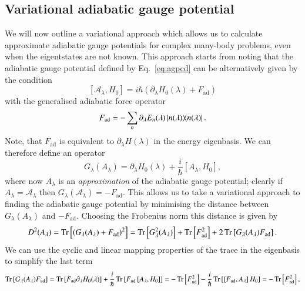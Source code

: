 \subsection{Variational adiabatic gauge potential}
\label{sec:varcd}
We will now outline a variational approach which allows us to calculate approximate adiabatic gauge potentials for complex many-body problems, even when the eigentstates are not known. This approach starts from noting that the adiabatic gauge potential defined by Eq.~\eqref{eq:agpcd} can be alternatively given by the condition \cite{jarzynski2013generating,sels2017minimizing,kolodrubetz2017geometry}
\begin{equation}
    \left[ \mathcal{A}_\lambda, H_0 \right] = i \hbar \left( \partial_\lambda H_0(\lambda) + F_\text{ad} \right)
\end{equation}
with the generalised adiabatic force operator
\begin{equation}
    F_\text{ad} = - \sum_n \partial_\lambda E_n (\lambda) \ketbra{n(\lambda)}.
\end{equation}
Note, that $F_\text{ad}$ is equivalent to $\partial_\lambda H(\lambda)$ in the energy eigenbasis. We can therefore define an operator
\begin{equation}\label{eq:glambda}
    G_\lambda (A_\lambda) = \partial_\lambda H_0(\lambda) + \frac{i}{\hbar} \left[ A_\lambda, H_0 \right],
\end{equation}
where now $A_\lambda$ is an {\it approximation} of the adiabatic gauge potential; clearly if $A_\lambda = \mathcal{A}_\lambda$ then $G_\lambda (\mathcal{A}_\lambda) = -F_\text{ad}$. This allows us to take a variational approach to finding the adiabatic gauge potential by minimising the distance between $G_\lambda(A_\lambda)$ and $-F_\text{ad}$. Choosing the Frobenius norm this distance is given by
\begin{equation}
    D^2(A_\lambda) = \Tr \left[ \left(G_\lambda(A_\lambda) + F_\text{ad} \right)^2 \right] = \Tr \left[G_\lambda^2 (A_\lambda)\right] + \Tr \left[F_\text{ad}^2\right] + 2\Tr \left[G_\lambda (A_\lambda) F_\text{ad}\right].
\end{equation}
We can use the cyclic and linear mapping properties of the trace in the eigenbasis to simplify the last term
\begin{equation}
    \Tr\left[G_\lambda (A_\lambda) F_\text{ad}\right] = \Tr\left[ F_\text{ad} \partial_\lambda H_0(\lambda) \right] + \frac{i}{\hbar} \Tr \left[ F_\text{ad} \left[ A_\lambda, H_0 \right] \right] = - \Tr \left[ F_\text{ad}^2 \right] - \frac{i}{\hbar} \Tr \left[ \left[ F_\text{ad}, A_\lambda\right] H_0 \right] =  - \Tr \left[ F_\text{ad}^2 \right],
\end{equation}
